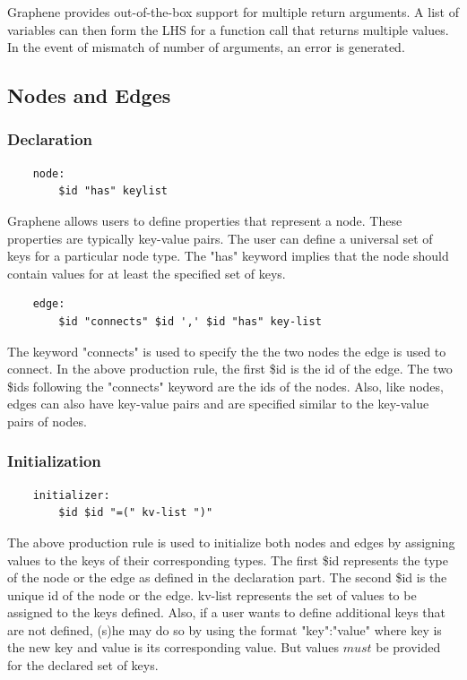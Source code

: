 \documentclass[a4paper]{article}
\begin{document}
\begin{large}
\indent Graphene provides out-of-the-box support for multiple return arguments. A list of variables can then form the LHS for a function call that returns multiple values. In the event of mismatch of number of arguments, an error is generated.

\subsection{Nodes and Edges}
\subsubsection{Declaration}
\begin{verbatim}
    node:
        $id "has" keylist
\end{verbatim}

\indent Graphene allows users to define properties that represent a node. These properties are typically key-value pairs. The user can define a universal set of keys for a particular node type. The "has" keyword implies that the node should contain values for at least the specified set of keys.

\begin{verbatim}
    edge:
        $id "connects" $id ',' $id "has" key-list
\end{verbatim}

\indent The keyword "connects" is used to specify the the two nodes the edge is used to connect. In the above production rule, the first \$id is the id of the edge. The two \$ids following the "connects" keyword are the ids of the nodes. Also, like nodes, edges can also have key-value pairs and are specified similar to the key-value pairs of nodes. 

\subsubsection{Initialization}
\begin{verbatim}
    initializer:
        $id $id "=(" kv-list ")"
\end{verbatim}

The above production rule is used to initialize both nodes and edges by assigning values to the keys of their corresponding types. The first \$id represents the type of the node or the edge as defined in the declaration part. The second \$id is the unique id of the node or the edge. kv-list represents the set of values to be assigned to the keys defined. Also, if a user wants to define additional keys that are not defined, (s)he may do so by using the format "key":"value" where key is the new key and value is its corresponding value. But values $must$ be provided for the declared set of keys.\newline


\end{large}
\end{document}

